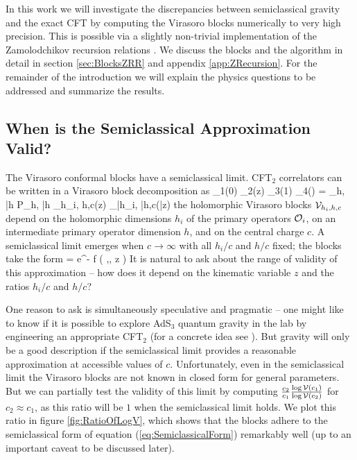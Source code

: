 In this work we will  investigate the discrepancies between semiclassical gravity and the exact CFT by computing the Virasoro blocks numerically to very high precision.  This is possible via a slightly non-trivial implementation of the Zamolodchikov recursion relations \cite{ZamolodchikovRecursion, Zamolodchikovq, Zamolodchikov:1986gh}.  We discuss the blocks and the algorithm in detail in section \ref{sec:BlocksZRR} and appendix \ref{app:ZRecursion}.  For the remainder of the introduction we will explain the physics questions to be addressed and summarize the results.


\subsection*{When is the Semiclassical Approximation Valid?}

The Virasoro conformal blocks have a semiclassical limit.  CFT$_2$ correlators can be written in a Virasoro block decomposition as
\be 
\< \CO_1(0)  \CO_2(z) \CO_3(1) \CO_4(\infty) \> = \sum_{h, \bar h} P_{h, \bar h} \CV_{h_i, h,c}(z) \CV_{\bar h_i, \bar h,c}(\bar z)
\ee
the holomorphic Virasoro blocks ${\cal V}_{h_i,h,c}$ depend on the holomorphic dimensions $h_i$ of the primary operators ${\cal O}_i$, on an intermediate primary operator dimension $h$, and on the central charge $c$.  A semiclassical limit emerges when $c \to \infty$ with all $h_i/ c$ and $h/c$ fixed; the blocks take the form 
\be \label{eq:SemiclassicalForm}
\CV = e^{- f \left( ,, z \right)}  
\ee
It is natural to ask about the range of validity of this approximation -- how does it depend on the kinematic variable $z$ and the ratios $h_i/c$ and $h/c$?

One reason to ask is simultaneously speculative and pragmatic -- one might like to know if it is possible to explore AdS$_3$ quantum gravity in the lab by engineering an appropriate CFT$_2$  (for a concrete idea see \cite{Plamadeala:2014roa}).  But gravity will only be a good description if the semiclassical limit provides a reasonable approximation at accessible values of $c$.  Unfortunately, even in the semiclassical limit the Virasoro blocks are not known in closed form for general parameters.  But we can partially test the validity of this limit by computing $\frac{c_2}{c_1} \frac{\log {\cal V}(c_1)}{\log {\cal V}(c_2)}$ for $c_2 \approx c_1$, as this ratio will be $1$ when the semiclassical limit holds.  We plot this ratio in figure \ref{fig:RatioOfLogV}, which shows that the blocks adhere to the semiclassical form of equation (\ref{eq:SemiclassicalForm}) remarkably well (up to an important caveat to be discussed later).

